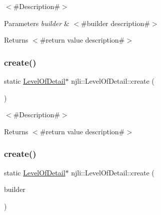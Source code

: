 $<$\#\+Description\#$>$


\begin{DoxyParams}{Parameters}
{\em builder} & $<$\#builder description\#$>$\\
\hline
\end{DoxyParams}
\begin{DoxyReturn}{Returns}
$<$\#return value description\#$>$ 
\end{DoxyReturn}
\mbox{\label{classnjli_1_1_level_of_detail_ae680727c2c235ebbe7075761220c2607}} 
\subsubsection{\texorpdfstring{create()}{create()}\hspace{0.1cm}{\footnotesize\ttfamily [2/3]}}
{\footnotesize\ttfamily static \mbox{\hyperlink{classnjli_1_1_level_of_detail}{Level\+Of\+Detail}}$\ast$ njli\+::\+Level\+Of\+Detail\+::create (\begin{DoxyParamCaption}{ }\end{DoxyParamCaption})\hspace{0.3cm}{\ttfamily [static]}}

$<$\#\+Description\#$>$

\begin{DoxyReturn}{Returns}
$<$\#return value description\#$>$ 
\end{DoxyReturn}
\mbox{\label{classnjli_1_1_level_of_detail_afb11a42b8ba72b23c0af91b3feb0f3d0}} 
\subsubsection{\texorpdfstring{create()}{create()}\hspace{0.1cm}{\footnotesize\ttfamily [3/3]}}
{\footnotesize\ttfamily static \mbox{\hyperlink{classnjli_1_1_level_of_detail}{Level\+Of\+Detail}}$\ast$ njli\+::\+Level\+Of\+Detail\+::create (\begin{DoxyParamCaption}\item[{const \mbox{\hyperlink{classnjli_1_1_level_of_detail_builder}{Level\+Of\+Detail\+Builder}} \&}]{builder }\end{DoxyParamCaption})\hspace{0.3cm}{\ttfamily [static]}}

